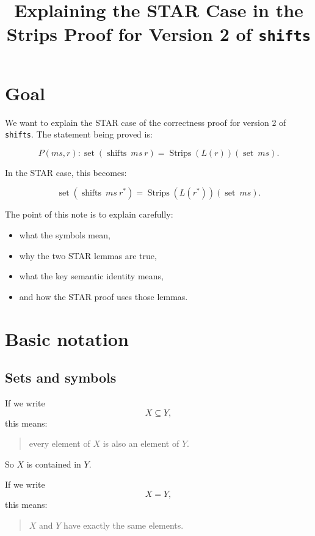 \documentclass[11pt]{article}
\title{Explaining the STAR Case in the Strips Proof for Version 2 of \texttt{shifts}}
\author{}
\date{}
\begin{document}
\maketitle

\section*{Goal}

We want to explain the STAR case of the correctness proof for version 2 of \texttt{shifts}. The statement being proved is:

\[
P(ms,r) : \operatorname{set}(\operatorname{shifts}\ ms\ r) = \operatorname{Strips}(L(r))(\operatorname{set}\ ms).
\]

In the STAR case, this becomes:

\[
\operatorname{set}(\operatorname{shifts}\ ms\ r^*) = \operatorname{Strips}(L(r^*))(\operatorname{set}\ ms).
\]

The point of this note is to explain carefully:

\begin{itemize}
\item what the symbols mean,
\item why the two STAR lemmas are true,
\item what the key semantic identity means,
\item and how the STAR proof uses those lemmas.
\end{itemize}

\section*{Basic notation}

\subsection*{Sets and symbols}

If we write
\[
X \subseteq Y,
\]
this means:

\begin{quote}
every element of \(X\) is also an element of \(Y\).
\end{quote}

So \(X\) is contained in \(Y\).

If we write
\[
X = Y,
\]
this means:

\begin{quote}
\(X\) and \(Y\) have exactly the same elements.
\end{quote}
\end{document}
